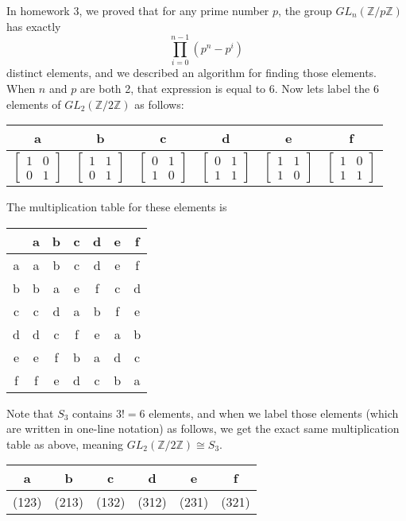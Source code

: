 \documentclass[12pt]{article}
\begin{document}
In homework 3, we proved that for any prime number $p$, the group $GL_n(\mathbb{Z}/p\mathbb{Z})$ has exactly
\[ \prod_{i=0}^{n-1} (p^n-p^i) \]
distinct elements, and we described an algorithm for finding those elements. When $n$ and $p$ are both 2, that expression is equal to 6. Now lets label the 6 elements of $GL_2(\mathbb{Z}/2\mathbb{Z})$ as follows:
\par
{\centering
\begin{tabular}{|c|c|c|c|c|c|}
    \hline
    a & b & c & d & e & f \\
    \hline
    $\left[ \begin{array}{cc} 1 & 0 \\ 0 & 1 \end{array} \right]$ &
    $\left[ \begin{array}{cc} 1 & 1 \\ 0 & 1 \end{array} \right]$ &
    $\left[ \begin{array}{cc} 0 & 1 \\ 1 & 0 \end{array} \right]$ &
    $\left[ \begin{array}{cc} 0 & 1 \\ 1 & 1 \end{array} \right]$ &
    $\left[ \begin{array}{cc} 1 & 1 \\ 1 & 0 \end{array} \right]$ &
    $\left[ \begin{array}{cc} 1 & 0 \\ 1 & 1 \end{array} \right]$ \\
    \hline
\end{tabular}\par}
\bigskip
The multiplication table for these elements is
\bigskip
\par
{\centering
\begin{tabular}{|c||c|c|c|c|c|c|}
    \hline
    &a&b&c&d&e&f \\
    \hline
    \hline
    a& a&b&c&d&e&f\\
    \hline
    b& b&a&e&f&c&d\\
    \hline
    c& c&d&a&b&f&e\\
    \hline
    d& d&c&f&e&a&b\\
    \hline
    e& e&f&b&a&d&c\\
    \hline
    f& f&e&d&c&b&a\\
    \hline
\end{tabular}\par}
\bigskip
Note that $S_3$ contains $3!=6$ elements, and when we label those elements (which are written in one-line notation) as follows, we get the exact same multiplication table as above, meaning $GL_2(\mathbb{Z}/2\mathbb{Z}) \cong S_3$.
\bigskip
\par
{\centering
\begin{tabular}{|c|c|c|c|c|c|}
    \hline
    a & b & c & d & e & f \\
    \hline
    (123) & (213) & (132) & (312) & (231) & (321) \\
    \hline
\end{tabular}\par}
\end{document}
